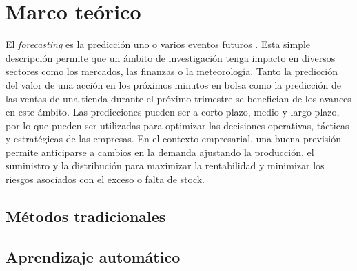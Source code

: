 \chapter{Marco teórico}\label{cap2}

El \textit{forecasting} es la predicción uno o varios eventos futuros \cite{intro}. Esta simple descripción permite que un ámbito de investigación tenga impacto en diversos sectores como los mercados, las finanzas o la meteorología. Tanto la predicción del valor de una acción en los próximos minutos en bolsa como la predicción de las ventas de una tienda durante el próximo trimestre se benefician de los avances en este ámbito. Las predicciones pueden ser a corto plazo, medio y largo plazo, por lo que pueden ser utilizadas para optimizar las decisiones operativas, tácticas y estratégicas de las empresas. En el contexto empresarial, una buena previsión permite anticiparse a cambios en la demanda ajustando la producción, el suministro y la distribución para maximizar la rentabilidad y minimizar los riesgos asociados con el exceso o falta de stock. 


\section{Métodos tradicionales}



\section{Aprendizaje automático}

